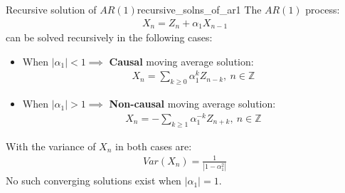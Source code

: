 \begin{proposition}{Recursive solution of $AR(1)$}{recursive_solns_of_ar1}
    The $AR(1)$ process:
    \begin{align*}
        X_n = Z_n + \alpha_1 X_{n-1}
    \end{align*}
    \noindent can be solved recursively in the following cases:
    \begin{itemize}
        \item When $|\alpha_1| < 1\implies$  \textbf{Causal} moving average solution:
        \begin{align*}
            X_n = \sum_{k\ge 0}\alpha_1^k Z_{n-k}, \ n\in\mathbb{Z}
        \end{align*}
        \item When $|\alpha_1| > 1\implies$ \textbf{Non-causal} moving average solution:
        \begin{align*}
            X_n = -\sum_{k\ge 1}\alpha_1^{-k}Z_{n+k}, \ n\in\mathbb{Z}
        \end{align*}
    \end{itemize}

    \noindent\newline With the variance of $X_n$ in both cases are:
    \begin{align*}
        Var(X_n) = \frac{1}{|1 - \alpha_1^2|}
    \end{align*}
    \noindent No such converging solutions exist when $|\alpha_1|=1$.
\end{proposition}

